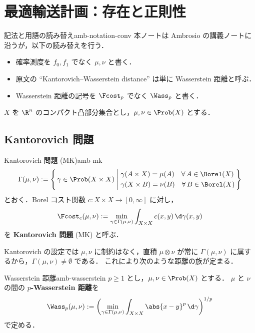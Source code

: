 \chapter{最適輸送計画：存在と正則性}
\label{ch:existence-regularity}

\begin{remark}{記法と用語の読み替え}{amb-notation-conv}
  本ノートは Ambrosio の講義ノートに沿うが，以下の読み替えを行う．
  \begin{itemize}
    \item 確率測度を $f_0, f_1$ でなく $\mu, \nu$ と書く．
    \item 原文の ``Kantorovich–Wasserstein distance'' は単に Wasserstein 距離と呼ぶ．
    \item Wasserstein 距離の記号を $\Fcost_p$ でなく $\Wass_p$ と書く．
  \end{itemize}
\end{remark}

$X$ を $\R^n$ のコンパクト凸部分集合とし，$\mu, \nu \in \Prob(X)$ とする．

\section{Kantorovich 問題}
\label{sec:kantorovich}

\begin{definition}{Kantorovich 問題 (MK)}{amb-mk}
  \[
    \Gamma(\mu,\nu) := \left\{\,
      \gamma \in \Prob(X \times X)
      \;\middle|\;
      \begin{aligned}
        &\gamma(A \times X) = \mu(A) \quad \forall\, A \in \Borel(X) \\
        &\gamma(X \times B) = \nu(B) \quad \forall\, B \in \Borel(X)
      \end{aligned}
    \,\right\}
  \]
  とおく．Borel コスト関数 $c \colon X \times X \to [0, \infty]$ に対し，
  \[
    \Fcost_c(\mu, \nu) :=
    \min_{\gamma \in \Gamma(\mu,\nu)}
    \int_{X \times X} c(x,y)\,\d\gamma(x,y)
  \]
  を \textbf{Kantorovich 問題} (MK) と呼ぶ．
\end{definition}

Kantorovich の設定では $\mu, \nu$ に制約はなく，直積 $\mu \otimes \nu$ が常に
$\Gamma(\mu,\nu)$ に属するから，$\Gamma(\mu,\nu) \neq \emptyset$ である．
これにより次のような距離の族が定まる．

\begin{definition}{Wasserstein 距離}{amb-wasserstein}
  $p \geq 1$ とし，$\mu, \nu \in \Prob(X)$ とする．
  $\mu$ と $\nu$ の間の \textbf{$p$-Wasserstein 距離}を
  \[
    \Wass_p(\mu, \nu)
    := \left(
      \min_{\gamma \in \Gamma(\mu,\nu)}
      \int_{X \times X} \abs{x - y}^p \,\d\gamma
    \right)^{1/p}
  \]
  で定める．
\end{definition}

